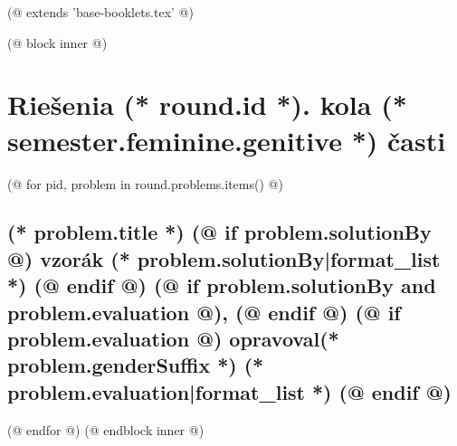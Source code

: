 (@ extends 'base-booklets.tex' @)

(@ block inner @)
    \pagestyle{seminar-booklet-body}

    \section{\texorpdfstring{Riešenia (* round.id *). kola (* semester.feminine.genitive *) časti}{Riešenia}}

    (@ for pid, problem in round.problems.items() @)%
        \setcounter{volume}{(* volume.number *)}%
        \setcounter{semester}{(* semester.number *)}%
        \setcounter{round}{(* round.number *)}%
        \setcounter{problem}{(* problem.number *)}%

        \subsection{%
            \texorpdfstring{%
                \large \textbf{(* problem.title *)} \hfill \normalsize%
                (@ if problem.solutionBy @)%
                    vzorák (* problem.solutionBy|format_list *)%
                (@ endif @)%
                (@ if problem.solutionBy and problem.evaluation @), (@ endif @)%
                (@ if problem.evaluation @)%
                    opravoval(* problem.genderSuffix *) (* problem.evaluation|format_list *)%
                (@ endif @)%
            }{(* round.number *).(* problem.number *) (* problem.title *)}%
        }

    (@ endfor @)
(@ endblock inner @)
